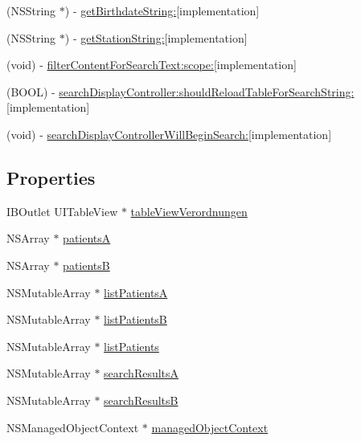 \begin{DoxyCompactItemize}
(N\+S\+String $\ast$) -\/ \hyperlink{interface_verordnungen_view_controller_ab4efe19d78a01e4932e86e0a0e1eba81}{get\+Birthdate\+String\+:}{\ttfamily  \mbox{[}implementation\mbox{]}}
\item 
(N\+S\+String $\ast$) -\/ \hyperlink{interface_verordnungen_view_controller_a61c216b91ea00491470d74edb2e49b4a}{get\+Station\+String\+:}{\ttfamily  \mbox{[}implementation\mbox{]}}
\item 
(void) -\/ \hyperlink{interface_verordnungen_view_controller_ade70be8f791c5b12f486f56fddde80db}{filter\+Content\+For\+Search\+Text\+:scope\+:}{\ttfamily  \mbox{[}implementation\mbox{]}}
\item 
(B\+O\+O\+L) -\/ \hyperlink{interface_verordnungen_view_controller_a21166fd9f608ff26819bcb0025ac2e0c}{search\+Display\+Controller\+:should\+Reload\+Table\+For\+Search\+String\+:}{\ttfamily  \mbox{[}implementation\mbox{]}}
\item 
(void) -\/ \hyperlink{interface_verordnungen_view_controller_a07d4e0defec451e82f3742165b22d8da}{search\+Display\+Controller\+Will\+Begin\+Search\+:}{\ttfamily  \mbox{[}implementation\mbox{]}}
\end{DoxyCompactItemize}
\subsection*{Properties}
\begin{DoxyCompactItemize}
\item 
I\+B\+Outlet U\+I\+Table\+View $\ast$ \hyperlink{interface_verordnungen_view_controller_ae01877c9a830e08c00ed79628be912d2}{table\+View\+Verordnungen}
\item 
N\+S\+Array $\ast$ \hyperlink{interface_verordnungen_view_controller_a96409e252e2dcc727c68fa310fd22e4c}{patients\+A}
\item 
N\+S\+Array $\ast$ \hyperlink{interface_verordnungen_view_controller_afa39ceba4365f9d7b0d47106c8b4041d}{patients\+B}
\item 
N\+S\+Mutable\+Array $\ast$ \hyperlink{interface_verordnungen_view_controller_a21bdc2f60942a832f7e59e97ce8e324d}{list\+Patients\+A}
\item 
N\+S\+Mutable\+Array $\ast$ \hyperlink{interface_verordnungen_view_controller_a9cedc930e4e51a79d12a716321cd11e9}{list\+Patients\+B}
\item 
N\+S\+Mutable\+Array $\ast$ \hyperlink{interface_verordnungen_view_controller_a7cdc38117e0a41702acafd9da7d5ab75}{list\+Patients}
\item 
N\+S\+Mutable\+Array $\ast$ \hyperlink{interface_verordnungen_view_controller_a867c44470c65e4119428fcb979afe459}{search\+Results\+A}
\item 
N\+S\+Mutable\+Array $\ast$ \hyperlink{interface_verordnungen_view_controller_a1c7cd4a09a0838ec92a4e34b9766fb69}{search\+Results\+B}
\item 
N\+S\+Managed\+Object\+Context $\ast$ \hyperlink{interface_verordnungen_view_controller_afd4f386adc2c15ef7e93b2ba47f0fa57}{managed\+Object\+Context}
\end{DoxyCompactItemize}


